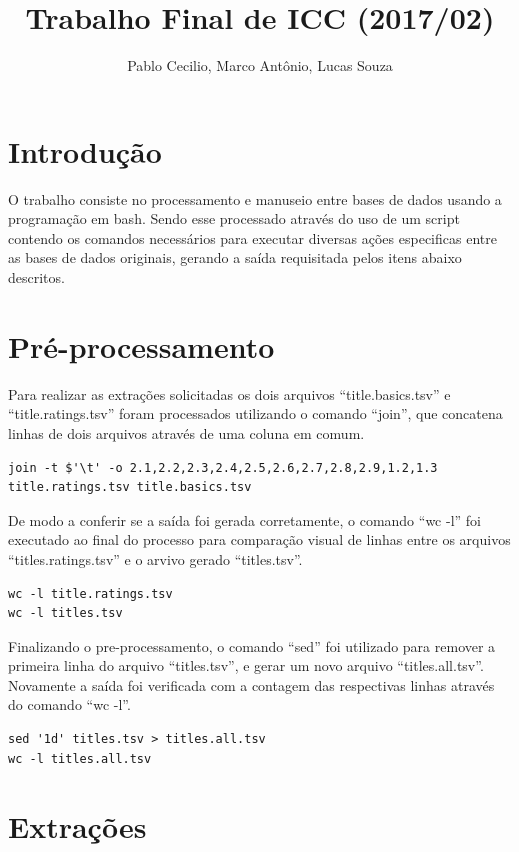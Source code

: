 \documentclass[12pt]{article}
\title{Trabalho Final de ICC (2017/02)}
\author{Pablo Cecilio, Marco Antônio, Lucas Souza}
\date{}
\begin{document}
\maketitle

\section{Introdução}

O trabalho consiste no processamento e manuseio entre bases de dados usando a programação em bash. Sendo esse processado através do uso de um script contendo os comandos necessários para executar diversas ações especificas entre as bases de dados originais, gerando a saída requisitada pelos itens abaixo descritos.

\section{Pré-processamento}

Para realizar as extrações solicitadas os dois arquivos ``title.basics.tsv'' e ``title.ratings.tsv'' foram processados utilizando o comando ``join'', que concatena linhas de dois arquivos através de uma coluna em comum.

\begin{verbatim}
join -t $'\t' -o 2.1,2.2,2.3,2.4,2.5,2.6,2.7,2.8,2.9,1.2,1.3 title.ratings.tsv title.basics.tsv
\end{verbatim}

De modo a conferir se a saída foi gerada corretamente, o comando ``wc -l'' foi executado ao final do processo para comparação visual de linhas entre os arquivos ``titles.ratings.tsv'' e o arvivo gerado ``titles.tsv''.

\begin{verbatim}
wc -l title.ratings.tsv
wc -l titles.tsv
\end{verbatim}

Finalizando o pre-processamento, o comando ``sed'' foi utilizado para remover a primeira linha do arquivo ``titles.tsv'', e gerar um novo arquivo ``titles.all.tsv''. Novamente a saída foi verificada com a contagem das respectivas linhas através do comando ``wc -l''.

\begin{verbatim}
sed '1d' titles.tsv > titles.all.tsv
wc -l titles.all.tsv
\end{verbatim}

\section{Extrações}
\end{document}
